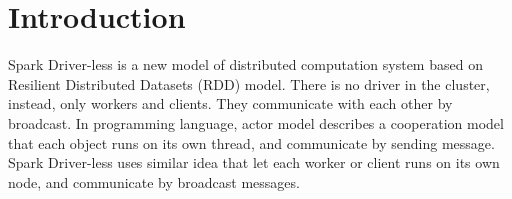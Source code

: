 
\section{Introduction} %
\label{sec:introduction}

Spark Driver-less is a new model of distributed computation system based on Resilient Distributed Datasets (RDD)\cite{rdd} model.
There is no driver in the cluster, instead, only workers and clients.
They communicate with each other by broadcast.
In programming language, actor model describes a cooperation model that each object runs on its own thread,
and communicate by sending message.
Spark Driver-less uses similar idea that let each worker or client runs on its own node,
and communicate by broadcast messages.

